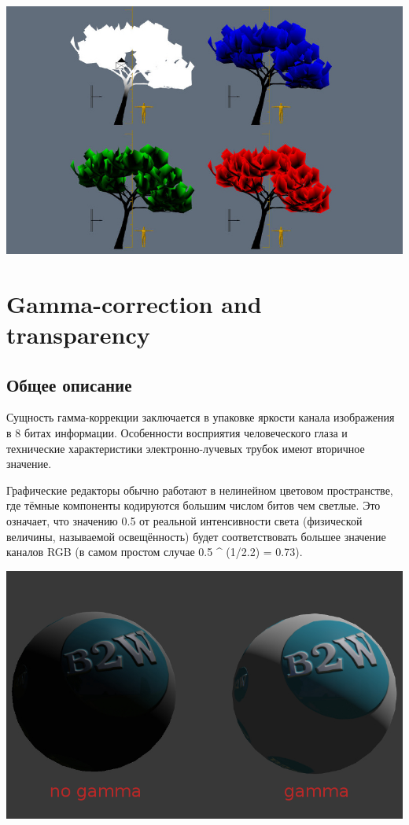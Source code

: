 \documentclass[a4paper,12pt,oneside]{sphinxmanual}
\begin{document}
{\hfill\includegraphics[width=1.000\linewidth]{wind_bending_vcolors.jpg}\hfill}


\chapter{Gamma-correction and transparency}
\label{gamma_alpha::doc}\label{gamma_alpha:gamma}\label{gamma_alpha:id1}

\section{Общее описание}
\label{gamma_alpha:id2}
Сущность гамма-коррекции заключается в упаковке яркости канала изображения в 8
битах информации. Особенности восприятия человеческого глаза и технические
характеристики электронно-лучевых трубок имеют вторичное значение.

Графические редакторы обычно работают в нелинейном цветовом пространстве,
где тёмные компоненты кодируются большим числом битов чем светлые. Это означает,
что значению 0.5 от реальной интенсивности света (физической величины, называемой
освещённость) будет соответствовать большее значение каналов RGB (в самом
простом случае 0.5 \textasciicircum{} (1/2.2) = 0.73).

{\hfill\includegraphics[width=1.000\linewidth]{gamma.jpg}\hfill}
\end{document}
